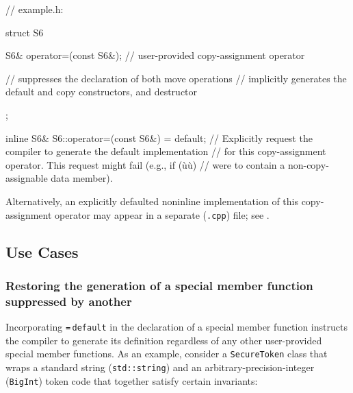 \begin{emcppslisting}[language=C++,label=default-exampleh-code]
// example.h:

struct S6
{
    S6& operator=(const S6&);  // user-provided copy-assignment operator

    // suppresses the declaration of both move operations
    // implicitly generates the default and copy constructors, and destructor
};

inline S6& S6::operator=(const S6&) = default;
    // Explicitly request the compiler to generate the default implementation
    // for this copy-assignment operator. This request might fail (e.g., if (ù{}ù)
    // were to contain a non-copy-assignable data member).
\end{emcppslisting}

\noindent Alternatively, an explicitly defaulted noninline implementation of this
copy-assignment operator may appear in a separate (\lstinline!.cpp!) file;
see .

\subsection[Use Cases]{Use Cases}\label{default-use-cases}

\subsubsection[Restoring the generation of a special member function suppressed by another]{Restoring the generation of a special member function suppressed by another}\label{restoring-the-generation-of-a-special-member-function-suppressed-by-another}

Incorporating \lstinline!=!\,\lstinline!default! in the declaration of a
special member function instructs the compiler to generate its
definition regardless of any other user-provided special member
functions. As an example, consider a 
\lstinline!SecureToken! class that wraps a standard string
(\lstinline!std::string!) and an arbitrary-precision-integer
(\lstinline!BigInt!) token code that together satisfy certain invariants:

